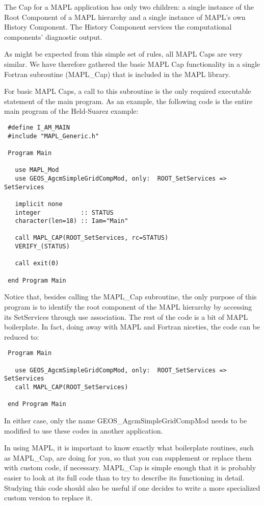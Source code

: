  The Cap for a MAPL application has only two children: a single instance
 of the Root Component of a MAPL hierarchy and a single instance of MAPL's
 own History Component. The History Component services the computational
 components' diagnostic output.
 
 As might be expected from this simple set of rules, all MAPL Caps are
 very similar. We have therefore gathered the basic MAPL Cap functionality
 in a single Fortran subroutine (MAPL\_Cap) that is included in the
 MAPL library.

 For basic MAPL Caps, a call to this subroutine is the only required
 executable statement of the main program. As an example, the following code
 is the entire main program of the Held-Suarez example:
 \begin{verbatim}
 #define I_AM_MAIN
 #include "MAPL_Generic.h"

 Program Main

   use MAPL_Mod
   use GEOS_AgcmSimpleGridCompMod, only:  ROOT_SetServices => SetServices

   implicit none
   integer           :: STATUS
   character(len=18) :: Iam="Main"

   call MAPL_CAP(ROOT_SetServices, rc=STATUS)
   VERIFY_(STATUS)

   call exit(0)

 end Program Main
 \end{verbatim}
 
 Notice that, besides calling the MAPL\_Cap subroutine, the only purpose
 of this program is to identify the root component of the MAPL hierarchy
 by accessing its SetServices through use association. The rest of the code
 is a bit of MAPL boilerplate. In fact, doing away with MAPL and Fortran
 niceties, the code can be reduced to:
 
 \begin{verbatim}
 Program Main

   use GEOS_AgcmSimpleGridCompMod, only:  ROOT_SetServices => SetServices
   call MAPL_CAP(ROOT_SetServices)

 end Program Main
 \end{verbatim}
 
 In either case, only the name GEOS\_AgcmSimpleGridCompMod needs to be
 modified to use these codes in another application.
 
 In using MAPL, it is important to know exactly what boilerplate routines,
 such as MAPL\_Cap, are doing for you, so that you can supplement or replace
 them with custom code, if necessary. MAPL\_Cap is simple enough that it is
 probably easier to look at its full code than to try to describe its
 functioning in detail. Studying this code should also be useful if one
 decides to write a more specialized custom version to replace it. 
